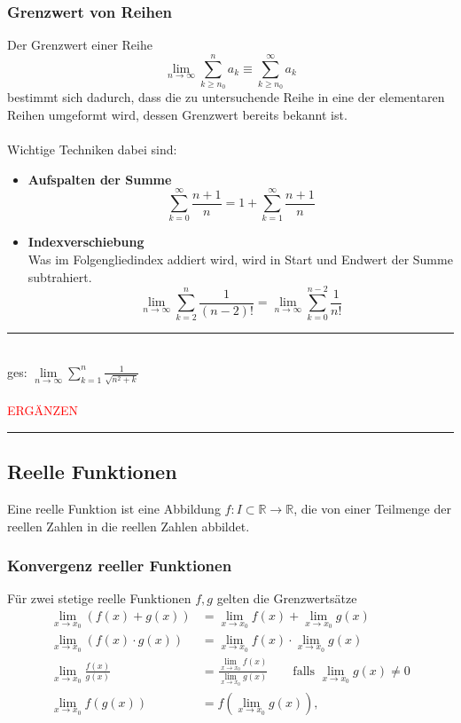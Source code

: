 \documentclass{article}
\newcommand{\lr}[1]{\left(#1\right)}
\begin{document}
\subsubsection{Grenzwert von Reihen}
Der Grenzwert einer Reihe
	\begin{equation}
		\lim\limits_{n\rightarrow\infty} \sum_{k\geq n_0}^n a_k \equiv \sum_{k\geq n_0}^\infty a_k
	\end{equation}
bestimmt sich dadurch, dass die zu untersuchende Reihe in eine der elementaren Reihen umgeformt wird, dessen Grenzwert bereits bekannt ist.\\
\\
Wichtige Techniken dabei sind:
\begin{itemize}
	\item \textbf{Aufspalten der Summe}
		$$\sum_{k=0}^\infty \frac{n + 1}{n} = 1 + \sum_{k=1}^\infty \frac{n + 1}{n}$$
		
	\item \textbf{Indexverschiebung}\\
	Was im Folgengliedindex addiert wird, wird in Start und Endwert der Summe subtrahiert.
		$$\lim\limits_{n\rightarrow\infty}\sum_{k = 2}^n \frac{1}{(n - 2)!} = \lim\limits_{n\rightarrow\infty} \sum_{k = 0}^{ n- 2} \frac{1}{n!}$$
\end{itemize}


{\color{blue}
\hrule
	\\
	ges: $\lim\limits_{n\to\infty} \sum_{k=1}^n \frac{1}{\sqrt{n^2 + k}}$\\
	\\
	\textcolor{red}{ERGÄNZEN}

\hrule
}


\newpage


\subsection{Reelle Funktionen}
Eine reelle Funktion ist eine Abbildung $f:I\subset\mathbb{R}\to\mathbb{R}$, die von einer Teilmenge der reellen Zahlen in die reellen Zahlen abbildet.


\subsubsection{Konvergenz reeller Funktionen}
Für zwei stetige reelle Funktionen $f, g$ gelten die Grenzwertsätze
	\begin{align}
		\lim_{x \to x_0} (f(x) + g(x)) &= \lim_{x\rightarrow x_0} f(x) + \lim_{x \to x_0} g(x)\\
		\lim_{x \to x_0} (f(x) \cdot g(x)) &= \lim_{x \to x_0} f(x) \cdot \lim_{x \to x_0} g(x)\\
		\lim_{x \to x_0} \frac{f(x)}{g(x)} &= \frac{\lim_{x \to x_0} f(x)}{\lim_{x \to x_0} g(x)} \qquad \text{falls $\lim_{x \to x_0} g(x) \neq 0$} \\
		\lim_{x \to x_0} f(g(x)) &= f \lr{ \lim_{x \to x_0} g(x) },
	\end{align}
\end{document}
